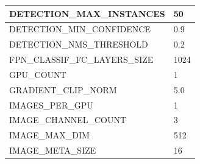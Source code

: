 \begin{longtable}[h]{|l|l|}
	DETECTION\_MAX\_INSTANCES       & 50                                                                                                                                                                                     \\ \hline
	DETECTION\_MIN\_CONFIDENCE      & 0.9                                                                                                                                                                                    \\ \hline
	DETECTION\_NMS\_THRESHOLD       & 0.2                                                                                                                                                                                    \\ \hline
	FPN\_CLASSIF\_FC\_LAYERS\_SIZE  & 1024                                                                                                                                                                                   \\ \hline
	GPU\_COUNT                      & 1                                                                                                                                                                                      \\ \hline
	GRADIENT\_CLIP\_NORM            & 5.0                                                                                                                                                                                    \\ \hline
	IMAGES\_PER\_GPU                & 1                                                                                                                                                                                      \\ \hline
	IMAGE\_CHANNEL\_COUNT           & 3                                                                                                                                                                                      \\ \hline
	IMAGE\_MAX\_DIM                 & 512                                                                                                                                                                                    \\ \hline
	IMAGE\_META\_SIZE               & 16                                                                                                                                                                                     \\ \hline

\end{longtable}
